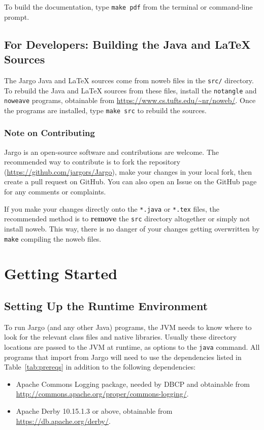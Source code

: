 To build the documentation, type \texttt{make pdf} from the terminal or
command-line prompt.

\section{For Developers: Building the Java and LaTeX Sources}

The Jargo Java and LaTeX sources come from noweb files in the \texttt{src/}
directory. To rebuild the Java and LaTeX sources from these files, install the
\texttt{notangle} and \texttt{noweave} programs, obtainable from
\url{https://www.cs.tufts.edu/~nr/noweb/}. Once the programs are installed,
type \texttt{make src} to rebuild the sources.

\subsection*{Note on Contributing}

Jargo is an open-source software and contributions are welcome. The recommended
way to contribute is to fork the repository
(\url{https://github.com/jargors/Jargo}), make your changes in your local fork,
then create a pull request on GitHub. You can also open an Issue on the GitHub
page for any comments or complaints.

If you make your changes directly onto the \texttt{*.java} or \texttt{*.tex}
files, the recommended method is to \textbf{remove} the \texttt{src} directory
altogether or simply not install noweb. This way, there is no danger of your
changes getting overwritten by \texttt{make} compiling the noweb files.

\nwenddocs{}\chapter{Getting Started}
\label{ch:getting}

\section{Setting Up the Runtime Environment}

To run Jargo (and any other Java) programs, the JVM needs to know where to look
for the relevant class files and native libraries. Usually these directory
locations are passed to the JVM at runtime, as options to the \texttt{java}
command. All programs that import from Jargo will need to use the dependencies
listed in Table~\ref{tab:prereqs} in addition to the following dependencies:
\begin{itemize}
\item Apache Commons Logging package, needed by DBCP and obtainable from
\url{http://commons.apache.org/proper/commons-logging/}.
\item Apache Derby 10.15.1.3 or above, obtainable from
\url{https://db.apache.org/derby/}.
\end{itemize}


